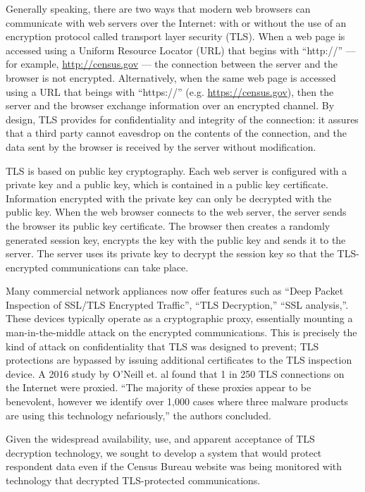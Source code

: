 \documentclass[fleqn,10pt]{wlscirep}
\begin{document}
Generally speaking, there are two ways that modern web browsers can
communicate with web servers over the Internet: with or without the
use of an encryption protocol called transport layer security
(TLS). When a web page is accessed using a Uniform Resource Locator
(URL) that begins with ``http://'' --- for example,
\url{http://census.gov} --- the connection between the server and the
browser is not encrypted. Alternatively, when the same web page is
accessed using a URL that beings with ``https://''
(e.g. \url{https://census.gov}), then the server and the browser
exchange information over an encrypted channel.  By design, TLS
provides for confidentiality and integrity of the connection: it
assures that a third party cannot eavesdrop on the contents of the
connection, and the data sent by the browser is received by the server
without modification.

TLS is based on public key cryptography. Each web server is configured
with a private key and a public key, which is contained in a public
key certificate. Information encrypted with the private key can only
be decrypted with the public key. When the web browser connects to the
web server, the server sends the browser its public key
certificate. The browser then creates a randomly generated session
key, encrypts the key with the public key and sends it to the
server. The server uses its private key to decrypt the session key so
that the TLS-encrypted communications can take place.

Many commercial network appliances now offer features such as ``Deep
Packet Inspection of SSL/TLS Encrypted
Traffic''\cite{sonicwall}, ``TLS Decryption,''\cite{paloalto} ``SSL
analysis,''\cite{globalsign}. These devices typically operate as a
cryptographic proxy, essentially mounting a man-in-the-middle attack
on the encrypted communications. This is precisely the kind of attack
on confidentiality that TLS was designed to prevent; TLS protections
are bypassed by issuing additional certificates to the TLS inspection
device. A 2016 study by O'Neill et. al found that 1 in 250 TLS
connections on the Internet were proxied. ``The majority of these proxies appear to be benevolent,
however we identify over 1,000 cases where three malware
products are using this technology nefariously,'' the authors concluded.\cite{DBLP:conf/imc/ONeillRSZ16}

Given the widespread availability, use, and apparent acceptance of TLS
decryption technology, we sought to develop a system that would
protect respondent data even if the Census Bureau website was being
monitored with technology that decrypted TLS-protected communications. 
 
\end{document}

